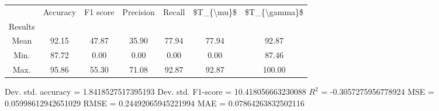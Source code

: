\begin{tabular}{|c|c|c|c|c|c|c|}
\toprule
{} &  Accuracy &  F1 score &  Precision &  Recall &  \$T\_\{\textbackslash mu\}\$ &  \$T\_\{\textbackslash gamma\}\$ \\
Results &           &           &            &         &            &               \\
\hline
Mean    &     92.15 &     47.87 &      35.90 &   77.94 &      77.94 &         92.87 \\
Min.    &     87.72 &      0.00 &       0.00 &    0.00 &       0.00 &         87.46 \\
Max.    &     95.86 &     55.30 &      71.08 &   92.87 &      92.87 &        100.00 \\
\bottomrule
\end{tabular}

 Dev. std. accuracy = 1.8418527517395193
 Dev. std. F1-score = 10.418056663230088
 $R^2$ = -0.3057275956778924
 MSE = 0.05998612942651029
 RMSE = 0.24492065945221994
 MAE = 0.07864263832502116